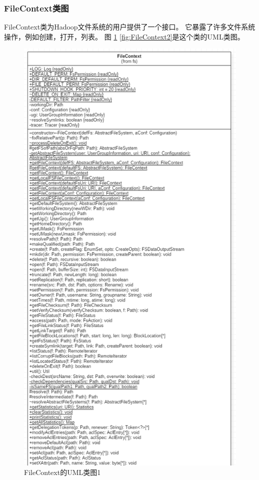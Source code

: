 \subsubsection{FileContext类图}
FileContext类为Hadoop文件系统的用户提供了一个接口。 它暴露了许多文件系统操作，例如创建，打开，列表。
图 \ref{fig:FileContext1} \ref{fig:FileContext2}是这个类的UML类图。
\begin{figure}
\centering
\includegraphics[width=1\linewidth]{UML/abstractfilesystem/FileContext1.PNG}
\caption{FileContext的UML类图1}
\label{fig:FileContext1}
\end{figure}

